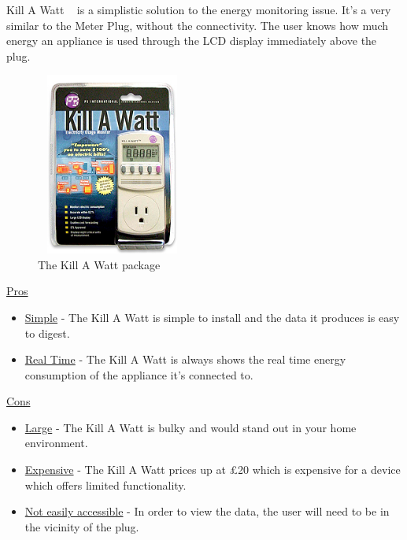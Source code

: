 \documentclass[draft,preprint,12pt,3p]{elsarticle}
\begin{document}
Kill A Watt ~\cite{killawatt} is a simplistic solution to the energy monitoring issue. It's a very similar to the Meter Plug, without the connectivity. The user knows how much energy an appliance is used through the LCD display immediately above the plug.

\begin{figure}[h]
    \centering
    \includegraphics[width=5cm, height=6cm]{existing/killawatt}
    \caption {The Kill A Watt package}
\end{figure}

\begin{center}
    \underline{Pros}
    \begin{itemize}
      \item \underline{Simple} - The Kill A Watt is simple to install and the data it produces is easy to digest.
      \item \underline{Real Time} - The Kill A Watt is always shows the real time energy consumption of the appliance it's connected to.
    \end{itemize}
    
    \underline{Cons}
    
    \begin{itemize}
      \item \underline{Large} - The Kill A Watt is bulky and would stand out in your home environment.
      \item \underline{Expensive} - The Kill A Watt prices up at \pounds20 which is expensive for a device which offers limited functionality.
      \item \underline{Not easily accessible} - In order to view the data, the user will need to be in the vicinity of the plug.
    \end{itemize}
    
\end{center}
\end{document}
